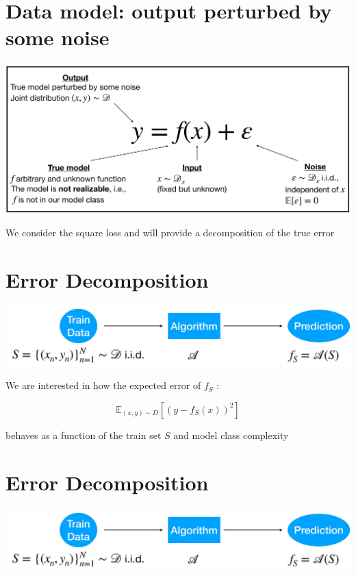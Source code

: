\documentclass[10pt]{article}
\begin{document}
\section*{Data model: output perturbed by some noise}
\begin{center}
\includegraphics[max width=\textwidth]{2023_12_30_442f876157646883c2c9g-14}
\end{center}

We consider the square loss and will provide a decomposition of the true error

\section*{Error Decomposition}
\begin{center}
\includegraphics[max width=\textwidth]{2023_12_30_442f876157646883c2c9g-15}
\end{center}

We are interested in how the expected error of $f_{S}$ :

$$
\mathbb{E}_{(x, y) \sim D}\left[\left(y-f_{S}(x)\right)^{2}\right]
$$

behaves as a function of the train set $S$ and model class complexity

\section*{Error Decomposition}
\begin{center}
\includegraphics[max width=\textwidth]{2023_12_30_442f876157646883c2c9g-16}
\end{center}
\end{document}
